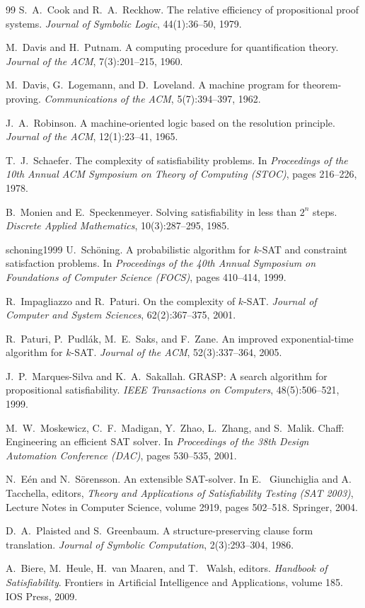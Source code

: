 \documentclass[a4paper,12pt]{article}
\theoremstyle{definition}
\begin{document}
\begin{thebibliography}{99}
S.~A.~Cook and R.~A.~Reckhow. The relative efficiency of propositional proof systems. \emph{Journal of Symbolic Logic}, 44(1):36--50, 1979.

M.~Davis and H.~Putnam. A computing procedure for quantification theory. \emph{Journal of the ACM}, 7(3):201--215, 1960.

M.~Davis, G.~Logemann, and D.~Loveland. A machine program for theorem-proving. \emph{Communications of the ACM}, 5(7):394--397, 1962.

J.~A.~Robinson. A machine-oriented logic based on the resolution principle. \emph{Journal of the ACM}, 12(1):23--41, 1965.

T.~J.~Schaefer. The complexity of satisfiability problems. In \emph{Proceedings of the 10th Annual ACM Symposium on Theory of Computing (STOC)}, pages 216--226, 1978.

B.~Monien and E.~Speckenmeyer. Solving satisfiability in less than $2^n$ steps. \emph{Discrete Applied Mathematics}, 10(3):287--295, 1985.

\bibitem schoning1999
U.~Sch\"oning. A probabilistic algorithm for $k$-SAT and constraint satisfaction problems. In \emph{Proceedings of the 40th Annual Symposium on Foundations of Computer Science (FOCS)}, pages 410--414, 1999.

R.~Impagliazzo and R.~Paturi. On the complexity of $k$-SAT. \emph{Journal of Computer and System Sciences}, 62(2):367--375, 2001.

R.~Paturi, P.~Pudl\'ak, M.~E.~Saks, and F.~Zane. An improved exponential-time algorithm for $k$-SAT. \emph{Journal of the ACM}, 52(3):337--364, 2005.

J.~P.~Marques-Silva and K.~A.~Sakallah. GRASP: A search algorithm for propositional satisfiability. \emph{IEEE Transactions on Computers}, 48(5):506--521, 1999.

M.~W.~Moskewicz, C.~F.~Madigan, Y.~Zhao, L.~Zhang, and S.~Malik. Chaff: Engineering an efficient SAT solver. In \emph{Proceedings of the 38th Design Automation Conference (DAC)}, pages 530--535, 2001.

N.~E\'en and N.~S\"orensson. An extensible SAT-solver. In E.~ Giunchiglia and A.~ Tacchella, editors, \emph{Theory and Applications of Satisfiability Testing (SAT 2003)}, Lecture Notes in Computer Science, volume 2919, pages 502--518. Springer, 2004.

D.~A.~Plaisted and S.~Greenbaum. A structure-preserving clause form translation. \emph{Journal of Symbolic Computation}, 2(3):293--304, 1986.

A.~Biere, M.~Heule, H.~van Maaren, and T.~ Walsh, editors. \emph{Handbook of Satisfiability}. Frontiers in Artificial Intelligence and Applications, volume 185. IOS Press, 2009.

\end{thebibliography}
\end{document}
